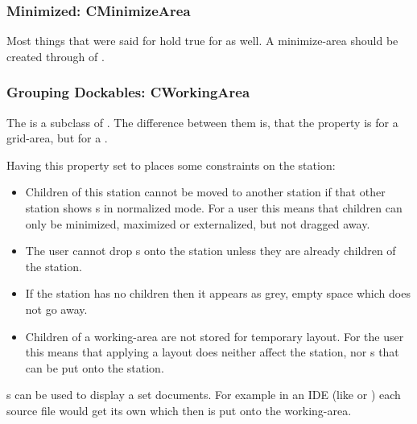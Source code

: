 \subsubsection{Minimized: CMinimizeArea}
Most things that were said for  hold true for  as well. A minimize-area should be created through  of .

\subsubsection{Grouping Dockables: CWorkingArea}
The  is a subclass of . The difference between them is, that the property  is  for a grid-area, but  for a . 

Having this property set to  places some constraints on the station:
\begin{itemize}
\item Children of this station cannot be moved to another station if that other station shows s in normalized mode. For a user this means that children can only be minimized, maximized or externalized, but not dragged away.
\item The user cannot drop s onto the station unless they are already children of the station.
\item If the station has no children then it appears as grey, empty space which does not go away.
\item Children of a working-area are not stored for temporary layout. For the user this means that applying a layout does neither affect the station, nor s that can be put onto the station.
\end{itemize}

s can be used to display a set documents. For example in an IDE (like  or ) each source file would get its own  which then is put onto the working-area.


